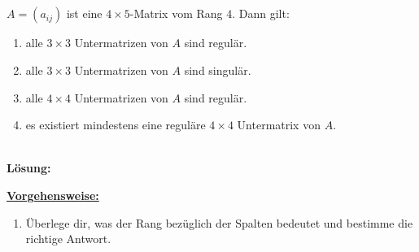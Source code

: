 \newpage

\subsection*{}
$A = (a_{ij})$ ist eine $4 \times 5$-Matrix vom Rang $4$.
Dann gilt:
\renewcommand{\labelenumi}{(\alph{enumi})}
\begin{enumerate}
\item 
alle $3 \times 3$ Untermatrizen von $A$ sind regulär.
\item 
alle $3 \times 3$ Untermatrizen von $A$ sind singulär.
\item 
alle $4 \times 4$ Untermatrizen von $A$ sind regulär.
\item
es existiert mindestens eine reguläre $4 \times 4$ Untermatrix von $A$.
\end{enumerate}
\ \\
\textbf{Lösung:}
\begin{mdframed}
\underline{\textbf{Vorgehensweise:}}
\renewcommand{\labelenumi}{\theenumi.}
\begin{enumerate}
\item Überlege dir, was der Rang bezüglich der Spalten bedeutet und bestimme die richtige Antwort.
\end{enumerate}
\end{mdframed}

